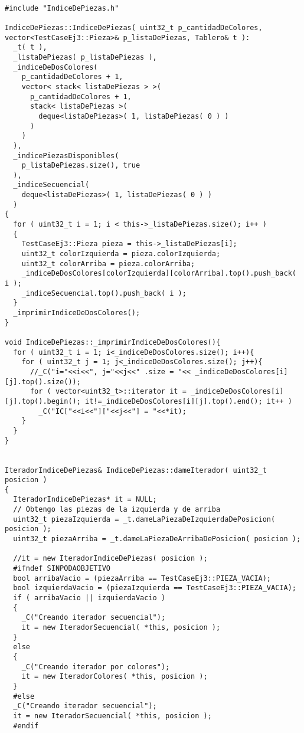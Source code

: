 \documentclass[11pt, a4paper, twoside]{article}
\begin{document}
\begin{lstlisting}

#include "IndiceDePiezas.h"

IndiceDePiezas::IndiceDePiezas( uint32_t p_cantidadDeColores, vector<TestCaseEj3::Pieza>& p_listaDePiezas, Tablero& t ):
  _t( t ),
  _listaDePiezas( p_listaDePiezas ),
  _indiceDeDosColores(
    p_cantidadDeColores + 1,
    vector< stack< listaDePiezas > >(
      p_cantidadDeColores + 1,
      stack< listaDePiezas >(
        deque<listaDePiezas>( 1, listaDePiezas( 0 ) )
      )
    )
  ),
  _indicePiezasDisponibles(
    p_listaDePiezas.size(), true
  ),
  _indiceSecuencial(
    deque<listaDePiezas>( 1, listaDePiezas( 0 ) )
  )
{
  for ( uint32_t i = 1; i < this->_listaDePiezas.size(); i++ )
  {
    TestCaseEj3::Pieza pieza = this->_listaDePiezas[i];
    uint32_t colorIzquierda = pieza.colorIzquierda;
    uint32_t colorArriba = pieza.colorArriba;
    _indiceDeDosColores[colorIzquierda][colorArriba].top().push_back( i );
    _indiceSecuencial.top().push_back( i );
  }
  _imprimirIndiceDeDosColores();
}

void IndiceDePiezas::_imprimirIndiceDeDosColores(){
  for ( uint32_t i = 1; i<_indiceDeDosColores.size(); i++){
    for ( uint32_t j = 1; j<_indiceDeDosColores.size(); j++){
      //_C("i="<<i<<", j="<<j<<" .size = "<< _indiceDeDosColores[i][j].top().size());
      for ( vector<uint32_t>::iterator it = _indiceDeDosColores[i][j].top().begin(); it!=_indiceDeDosColores[i][j].top().end(); it++ )
        _C("IC["<<i<<"]["<<j<<"] = "<<*it);
    }
  }
}


IteradorIndiceDePiezas& IndiceDePiezas::dameIterador( uint32_t posicion )
{
  IteradorIndiceDePiezas* it = NULL;
  // Obtengo las piezas de la izquierda y de arriba
  uint32_t piezaIzquierda = _t.dameLaPiezaDeIzquierdaDePosicion( posicion );
  uint32_t piezaArriba = _t.dameLaPiezaDeArribaDePosicion( posicion );

  //it = new IteradorIndiceDePiezas( posicion );
  #ifndef SINPODAOBJETIVO
  bool arribaVacio = (piezaArriba == TestCaseEj3::PIEZA_VACIA);
  bool izquierdaVacio = (piezaIzquierda == TestCaseEj3::PIEZA_VACIA);
  if ( arribaVacio || izquierdaVacio )
  {
    _C("Creando iterador secuencial");
    it = new IteradorSecuencial( *this, posicion );
  }
  else
  {
    _C("Creando iterador por colores");
    it = new IteradorColores( *this, posicion );
  }
  #else
  _C("Creando iterador secuencial");
  it = new IteradorSecuencial( *this, posicion );
  #endif


\end{lstlisting}
\end{document}

